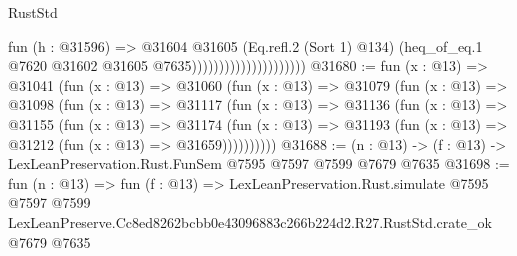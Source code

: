 \begin{lexlean}{RustStd}
\begin{coremodule}
                                          fun (h : @31596) =>
                                          @31604
                                            @31605
                                            (Eq.refl.{2} (Sort 1) @134)
                                            (heq_of_eq.{1}
                                              @7620
                                              @31602
                                              @31605
                                              @7635)))))))))))))))))))))
@31680 := fun (x : @13) =>
  @31041
    (fun (x : @13) =>
    @31060
      (fun (x : @13) =>
      @31079
        (fun (x : @13) =>
        @31098
          (fun (x : @13) =>
          @31117
            (fun (x : @13) =>
            @31136
              (fun (x : @13) =>
              @31155
                (fun (x : @13) =>
                @31174
                  (fun (x : @13) =>
                  @31193 (fun (x : @13) => @31212 (fun (x : @13) => @31659))))))))))
@31688 := (n : @13) -> (f : @13) -> LexLeanPreservation.Rust.FunSem @7595 @7597 @7599 @7679 @7635
@31698 := fun (n : @13) =>
  fun (f : @13) =>
  LexLeanPreservation.Rust.simulate
    @7595
    @7597
    @7599
    LexLeanPreserve.Cc8ed8262bcbb0e43096883c266b224d2.R27.RustStd.crate_ok
    @7679
    @7635
\end{coremodule}
\end{lexlean}
